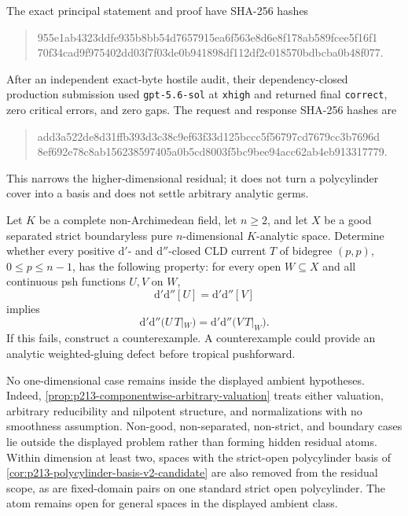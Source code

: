 The exact principal statement and proof have SHA-256 hashes
\begin{quote}
\small\ttfamily
955e1ab4323ddfe935b8bb54d7657915ea6f563e8d6e8f178ab589fcee5f16f1\\
70f34cad9f975402dd03f7f03de0b941898df112df2c018570bdbcba0b48f077.
\end{quote}
After an independent exact-byte hostile audit, their dependency-closed
production submission used \texttt{gpt-5.6-sol} at \texttt{xhigh} and
returned final \texttt{correct}, zero critical errors, and zero gaps.  The
request and response SHA-256 hashes are
\begin{quote}
\small\ttfamily
add3a522de8d31ffb393d3c38c9ef63f33d125bccc5f56797cd7679cc3b7696d\\
8ef692e78c8ab156238597405a0b5cd8003f5bc9bee94acc62ab4eb913317779.
\end{quote}
This narrows the higher-dimensional residual; it does not turn a
polycylinder cover into a basis and does not settle arbitrary analytic
germs.

\begin{problem}
\label{prob:frontier-cross-fan-upstairs}
Let \(K\) be a complete non-Archimedean field, let \(n\geq2\), and let \(X\)
be a good separated strict boundaryless pure \(n\)-dimensional
\(K\)-analytic space.  Determine whether every positive
\(\mathrm d'\)- and \(\mathrm d''\)-closed CLD current \(T\) of bidegree
\((p,p)\), \(0\leq p\leq n-1\), has the following property: for every open
\(W\subseteq X\) and all continuous psh functions \(U,V\) on \(W\),
\begin{equation}
                  \mathrm d'\mathrm d''[U]
                  =\mathrm d'\mathrm d''[V]
 \label{eq:p21p3-post-nonreduced-residual-equal-curvature}
\end{equation}
implies
\begin{equation}
 \mathrm d'\mathrm d''\bigl(U\,T|_W\bigr)
 =\mathrm d'\mathrm d''\bigl(V\,T|_W\bigr).
 \label{eq:p21p3-post-nonreduced-residual-bt}
\end{equation}
If this fails, construct a counterexample.  A counterexample could provide an
analytic weighted-gluing defect before tropical pushforward.
\end{problem}

No one-dimensional case remains inside the displayed ambient hypotheses.
Indeed, \cref{prop:p213-componentwise-arbitrary-valuation} treats either
valuation, arbitrary reducibility and nilpotent structure, and normalizations
with no smoothness assumption.  Non-good, non-separated, non-strict, and
boundary cases lie outside the displayed problem rather than forming hidden
residual atoms.  Within dimension at least two, spaces with the strict-open
polycylinder basis of
\cref{cor:p213-polycylinder-basis-v2-candidate} are also removed from the
residual scope, as are fixed-domain pairs on one standard strict open
polycylinder.  The atom remains open for general spaces in the displayed
ambient class.

